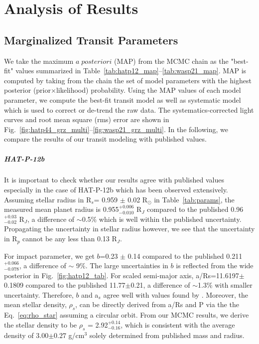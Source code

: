 \chapter{Analysis of Results}\label{sec:results}
\section{Marginalized Transit Parameters}

We take the maximum $a\;posteriori$ (MAP) from the MCMC chain as the "best-fit" values summarized in Table~\ref{tab:hatp12_map}--\ref{tab:wasp21_map}. MAP is computed by taking from the chain the set of model parameters with the highest posterior (prior$\times$likelihood) probability. Using the MAP values of each model parameter, we compute the best-fit transit model as well as systematic model which is used to correct or de-trend the raw data. The systematics-corrected light curves and root mean square (rms) error are shown in Fig.~\ref{fig:hatp44_grz_multi}--\ref{fig:wasp21_grz_multi}. %
In the following, we compare the results of our transit modeling with published values. %

\paragraph{HAT-P-12b}
It is important to check whether our results agree with published values especially in the case of HAT-P-12b which has been observed extensively. Assuming stellar radius in R$_s$= 0.959 $\pm$ 0.02 R$_{\odot}$ in Table~\ref{tab:params}, the measured mean planet radius is 0.955$^{+0.006}_{-0.010}$ R$_J$ compared to the published 0.96$^{+0.03}_{-0.02}$ R$_J$, a difference of $\sim$0.5\% which is well within the published uncertainty. Propagating the uncertainty in stellar radius however, we see that the uncertainty in R$_p$ cannot be any less than 0.13 R$_J$.

For impact parameter, we get $b$=0.23 $\pm$ 0.14 compared to the published 0.211$^{+0.066}_{-0.078}$, a difference of $\sim$ 9\%. The large uncertainties in $b$ is reflected from the wide posterior in Fig.~\ref{fig:hatp12_tab}. For scaled semi-major axis, a/Rs=11.6197$\pm$0.1809 compared to the published 11.77$\pm$0.21, a difference of $\sim$1.3\% with smaller uncertainty. Therefore, $b$ and a$_s$ agree well with values found by \cite{Hartmann2009}.
Moreover, the mean stellar density, $\rho_s$, can be directly derived from a/Rs and P via the the Eq.~\ref{eq:rho_star} assuming a circular orbit. From our MCMC results, we derive the stellar density to be $\rho_s$ = 2.92$_{-0.16}^{+0.14}$, which is consistent with the average density of 3.00$\pm0.27$ g/cm$^3$ solely determined from published mass and radius.

